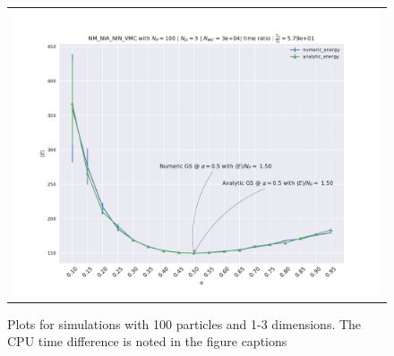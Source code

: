 \begin{figure}
\begin{tabular}{cc}
\multicolumn{2}{c}{\includegraphics[width=0.5\paperwidth]{figures/NM_NIA_NIN_np_100_nd_3.pdf} }
\end{tabular}
\caption{Plots for simulations with 100 particles and 1-3 dimensions. The CPU time difference is noted in the figure captions}
\label{fig:1b_100}
\end{figure}
